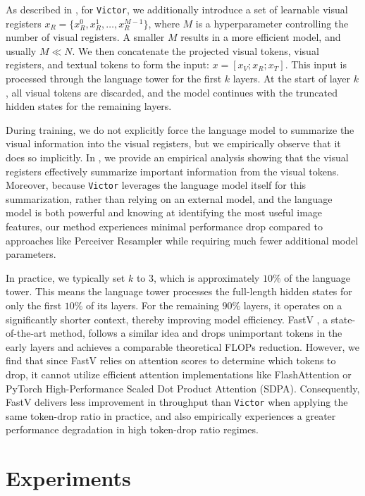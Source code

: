 \documentclass{article} %
\begin{document}
As described in , for \texttt{Victor}, we additionally introduce a set of learnable visual registers $x_R = \{x_R^0, x_R^1, \ldots, x_R^{M-1}\}$, where $M$ is a hyperparameter controlling the number of visual registers. A smaller $M$ results in a more efficient model, and usually $M \ll N$. We then concatenate the projected visual tokens, visual registers, and textual tokens to form the input: $x = [x_V; x_R; x_T]$. This input is processed through the language tower for the first $k$ layers. At the start of layer $k$, all visual tokens are discarded, and the model continues with the truncated hidden states for the remaining layers.


During training, we do not explicitly force the language model to summarize the visual information into the visual registers, but we empirically observe that it does so implicitly. In , we provide an empirical analysis showing that the visual registers effectively summarize important information from the visual tokens. Moreover, because \texttt{Victor} leverages the language model itself for this summarization, rather than relying on an external model, and the language model is both powerful and knowing at identifying the most useful image features, our method experiences minimal performance drop compared to approaches like Perceiver Resampler while requiring much fewer additional model parameters.

In practice, we typically set $k$ to $3$, which is approximately $10\%$ of the language tower. This means the language tower processes the full-length hidden states for only the first $10\%$ of its layers. For the remaining $90\%$ layers, it operates on a significantly shorter context, thereby improving model efficiency. FastV \citep{chen2024image}, a state-of-the-art method, follows a similar idea and drops unimportant tokens in the early layers and achieves a comparable theoretical FLOPs reduction. However, we find that since FastV relies on attention scores to determine which tokens to drop, it cannot utilize efficient attention implementations like FlashAttention \citep{dao2022flashattention, dao2023flashattention} or PyTorch High-Performance Scaled Dot Product Attention (SDPA). Consequently, FastV delivers less improvement in throughput than \texttt{Victor} when applying the same token-drop ratio in practice, and also empirically experiences a greater performance degradation in high token-drop ratio regimes.
\section{Experiments}
\end{document}
